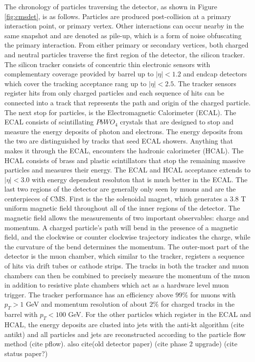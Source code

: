 The chronology of particles traversing the detector, as shown in Figure \ref{fig:cmsdet}, is as follows. Particles are produced post-collision at a primary interaction point, or primary vertex. Other interactions can occur nearby in the same snapshot and are denoted as pile-up, which is a form of noise obfuscating the primary interaction. From either primary or secondary vertices, both charged and neutral particles traverse the first region of the detector, the silicon tracker. The silicon tracker consists of concentric thin electronic sensors with complementary coverage provided by barrel up to $|\eta|<1.2$ and endcap detectors which cover the tracking acceptance rang up to $|\eta| < 2.5$. The tracker sensors  register hits from only charged particles and each sequence of hits can be connected into a track that represents the path and origin of the charged particle.  The next stop for particles, is the Electromagnetic Calorimeter (ECAL). The ECAL consists of scintillating $PbWO_4$ crystals that are designed to stop and measure the energy deposits of photon and electrons. The energy deposits from the two  are distinguished by tracks that seed ECAL showers. Anything that makes it through the ECAL, encounters the hadronic calorimeter (HCAL). The HCAL consists of brass and plastic scintillators that stop the remaining massive particles and measures their energy. The ECAL and HCAL acceptance extends to $|\eta| <3.0$ with energy dependent resoluton that is much better in the ECAL. The last two regions of the detector are generally only seen by muons and are the centerpieces of CMS. First is the the solenoidal magnet, which generates a 3.8 T uniform magnetic field throughout all of the inner regions of the detector. The magnetic field allows the measurements of two important observables: charge and momentum.  A charged particle's path will bend in the presence of a magnetic field, and the clockwise or counter clockwise trajectory indicates the charge, while the curvature of the bend determines the momentum. The outer-most part of the detector is the muon chamber, which similar to the tracker, registers a sequence of hits via drift tubes or cathode strips. The tracks in both the tracker and muon chambers can then be combined to precisely measure the momentum of the muon in addition to resistive plate chambers which act as a hardware level muon trigger. The tracker performance has an efficiency above $99\%$ for muons with $p_T > 1$ GeV and momentum resolution of about $2\%$ for charged tracks in the barrel with $p_T < 100$ GeV. For the other particles which register in the ECAL and HCAL, the energy deposits are clusted into jets with the anti-kt algorithm (cite antikt) and all particles and jets are reconstructed according to the particle flow method (cite pflow). also cite(old detector paper) (cite phase 2 upgrade) (cite status paper?)




